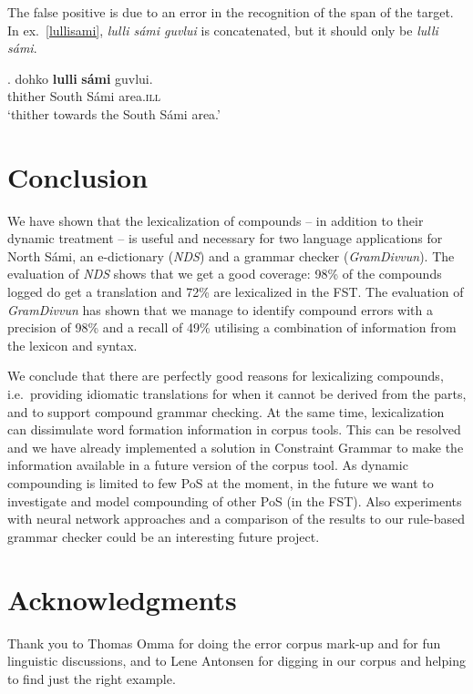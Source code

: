 \documentclass[free]{flammie}
\begin{document}
The false positive is due to an error in the recognition of the span of the
target. In ex.~\ref{lullisami}, \textit{lulli sámi guvlui} is concatenated, but it should only be \textit{lulli sámi}.

\exg. dohko \textbf{lulli} \textbf{sámi} guvlui.\label{lullisami}\\ %
thither South Sámi area\textsc{.ill}\\ %
`thither towards the South Sámi area.'



\section{Conclusion}

We have shown that the lexicalization of compounds -- in addition to their dynamic
treatment --
is useful and necessary
for two language applications for North Sámi, an e-dictionary (\textit{NDS}) and a
grammar checker (\textit{GramDivvun}).  The evaluation of
\textit{NDS} shows that we get a good coverage: 98\% of the compounds logged do get a translation and 72\% are lexicalized in the FST.
The evaluation
of \textit{GramDivvun} has shown that we manage to identify compound
errors with a precision of 98\% and a recall of 49\% utilising a
combination of information from the lexicon and syntax.


We conclude that there are perfectly
good reasons for lexicalizing compounds, i.e.\ providing idiomatic translations for when it
cannot be derived from the parts, and to support compound grammar checking. At the same time, lexicalization can
dissimulate word formation information in corpus tools.
This can be resolved and we have already implemented a solution in Constraint Grammar to make the information available in a
future version of the corpus tool.
As dynamic compounding is limited to few PoS at the moment, in the
future we want to investigate and model compounding of other PoS (in the FST).
Also experiments with neural network approaches and a comparison of the results to our rule-based grammar checker could be an interesting future project.




\section*{Acknowledgments}
Thank you to Thomas Omma for doing the error corpus mark-up and for fun linguistic discussions, and to Lene Antonsen for digging in our corpus and helping to find just the right example.



\end{document}
